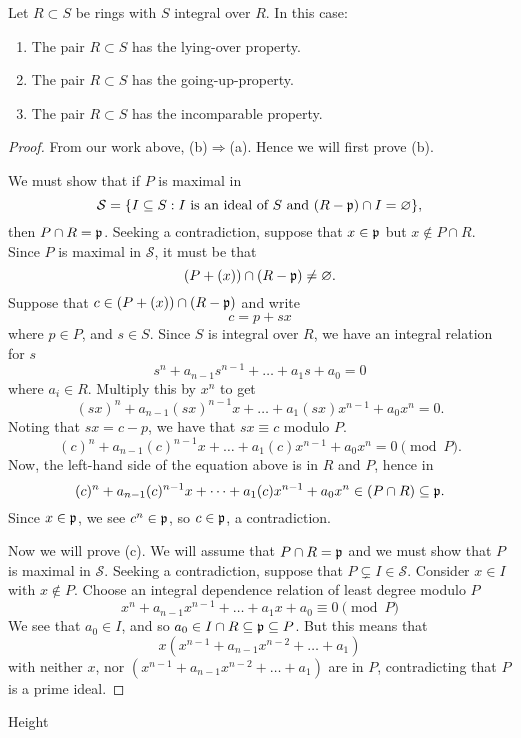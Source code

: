 \documentclass{ximera}
\begin{document}
\begin{theorem}[Going-up]
  Let $R\subset S$ be rings with $S$ integral over $R$. In this case:
  \begin{enumerate}
  \item The pair $R\subset S$ has the lying-over property.
  \item The pair $R\subset S$ has the going-up-property.
  \item The pair $R\subset S$ has the incomparable property.
  \end{enumerate}
  \begin{proof}
    From our work above, (b)$\Rightarrow$(a). Hence we will first
    prove (b).

    We must show that if $P$ is maximal in
    \[
    \mathcal{S} = \{I\subseteq S: \text{$I$ is an ideal of $S$ and
      $(R-\mathfrak{p})\cap I = \varnothing$}\},
    \]
    then $P\cap R = \mathfrak{p}$. Seeking a contradiction, suppose that
    $x\in\mathfrak{p}$ but $x\notin P\cap R$. Since $P$ is maximal in
    $\mathcal{S}$, it must be that
    \[
    (P + (x)) \cap (R-\mathfrak{p}) \ne \varnothing.
    \]
    Suppose that $c\in (P + (x)) \cap (R-\mathfrak{p})$ and write
    \[
    c = p + sx
    \]
    where $p\in P$, and $s\in S$. Since $S$ is integral over $R$, we
    have an integral relation for $s$
    \[
    s^n + a_{n-1}s^{n-1} + \dots + a_1 s + a_0 = 0
    \]
    where $a_i\in R$. Multiply this by $x^n$ to get
    \[
    (sx)^n + a_{n-1}(sx)^{n-1}x + \dots + a_1 (sx)x^{n-1} + a_0x^n = 0.
    \]
    Noting that $sx = c-p$, we have that $sx\equiv c$ modulo $P$.
    \[
    (c)^n + a_{n-1}(c)^{n-1}x + \dots + a_1 (c)x^{n-1} + a_0x^n = 0 \pmod{P}.
    \]
    Now, the left-hand side of the equation above is in $R$ and $P$,
    hence in
    \[
    (c)^n + a_{n-1}(c)^{n-1}x + \dots + a_1 (c)x^{n-1} + a_0x^n \in (P\cap R)\subseteq\mathfrak{p}. 
    \]
    Since $x\in\mathfrak{p}$, we see $c^n\in\mathfrak{p}$, so $c\in\mathfrak{p}$, a contradiction.


    Now we will prove (c). We will assume that $P\cap R = \mathfrak{p}$ and we
    must show that $P$ is maximal in $\mathcal{S}$. Seeking a
    contradiction, suppose that $P\subsetneq
    I\in\mathcal{S}$. Consider $x\in I$ with $x\notin P$. Choose an
    integral dependence relation of least degree modulo $P$
    \[
    x^n + a_{n-1}x^{n-1} + \dots + a_1 x + a_0 \equiv 0 \pmod{P}
    \]
    We see that $a_0\in I$, and so $a_0\in I \cap R \subseteq \mathfrak{p} \subseteq P$. But this means that
    \[
    x(x^{n-1} + a_{n-1}x^{n-2} + \dots + a_1)
    \]
    with neither $x$, nor $(x^{n-1} + a_{n-1}x^{n-2} + \dots + a_1)$
    are in $P$, contradicting that $P$ is a prime ideal.
  \end{proof}
\end{theorem}


\begin{definition}
  Height
\end{definition}

\begin{corollary}
\end{corollary}

\begin{corollary}
\end{corollary}
\end{document}
